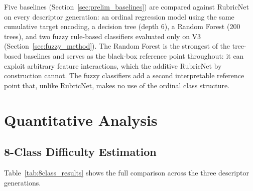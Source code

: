 Five baselines (Section~\ref{sec:prelim_baselines}) are compared against RubricNet on every descriptor generation: an ordinal regression model using the same cumulative target encoding, a decision tree (depth 6), a Random Forest (200 trees), and two fuzzy rule-based classifiers evaluated only on V3 (Section~\ref{sec:fuzzy_method}). The Random Forest is the strongest of the tree-based baselines and serves as the black-box reference point throughout: it can exploit arbitrary feature interactions, which the additive RubricNet by construction cannot. The fuzzy classifiers add a second interpretable reference point that, unlike RubricNet, makes no use of the ordinal class structure.

\section{Quantitative Analysis}
\label{sec:quantitative}

\subsection{8-Class Difficulty Estimation}
Table~\ref{tab:8class_results} shows the full comparison across the three descriptor generations.

